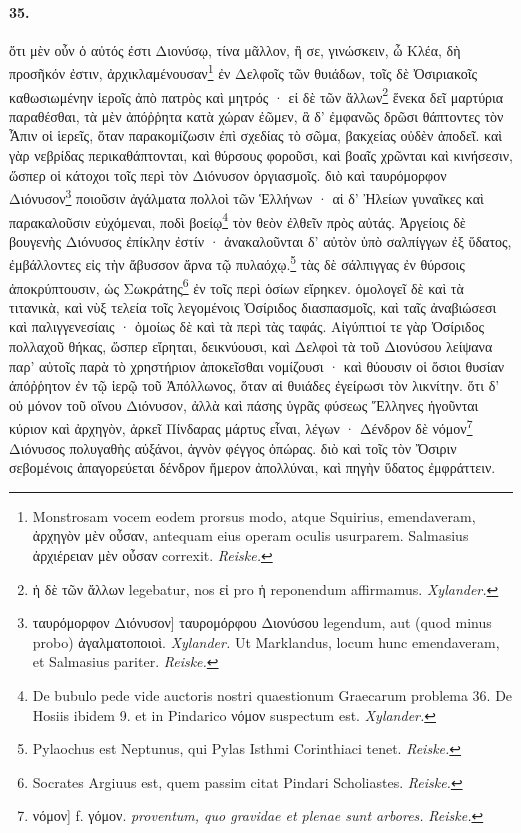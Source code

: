 \documentclass[a4paper, 11pt, oneside, polutonikogreek, german, landscape]{article}
\begin{document}
\paragraph{35.}
ὅτι μὲν οὖν ὁ αὐτός ἐστι Διονύσῳ, τίνα μᾶλλον, ἢ σε, γινώσκειν, ὦ Κλέα, δὴ προσῆκόν ἐστιν, ἀρχικλαμένουσαν\footnote{Monstrosam vocem eodem prorsus modo, atque Squirius, emendaveram, ἀρχηγὸν μὲν οὖσαν, antequam eius operam oculis usurparem. Salmasius ἀρχιέρειαν μὲν οὖσαν correxit. \emph{Reiske.}} ἐν Δελφοῖς τῶν θυιάδων, τοῖς δὲ Ὀσιριακοῖς καθωσιωμένην ἱεροῖς ἀπὸ πατρὸς καὶ μητρός · εἰ δὲ τῶν ἄλλων\footnote{ἡ δὲ τῶν ἄλλων legebatur, nos εἰ pro ἡ reponendum affirmamus. \emph{Xylander.}} ἕνεκα δεῖ μαρτύρια παραθέσθαι, τὰ μὲν ἀπόῤῥητα κατὰ χώραν ἐῶμεν, ἃ δ' ἐμφανῶς δρῶσι θάπτοντες τὸν Ἆπιν οἱ ἱερεῖς, ὅταν παρακομίζωσιν ἐπὶ σχεδίας τὸ σῶμα, βακχείας οὐδὲν ἀποδεῖ. καὶ γὰρ νεβρίδας περικαθάπτονται, καὶ θύρσους φοροῦσι, καὶ βοαῖς χρῶνται καὶ κινήσεσιν, ὥσπερ οἱ κάτοχοι τοῖς περὶ τὸν Διόνυσον ὀργιασμοῖς. διὸ καὶ ταυρόμορφον Διόνυσον\footnote{ταυρόμορφον Διόνυσον] ταυρομόρφου Διονύσου legendum, aut (quod minus probo) ἀγαλματοποιοὶ. \emph{Xylander.} Ut Marklandus, locum hunc emendaveram, et Salmasius pariter. \emph{Reiske.}} ποιοῦσιν ἀγάλματα πολλοὶ τῶν Ἑλλήνων · αἱ δ' Ἠλείων γυναῖκες καὶ παρακαλοῦσιν εὐχόμεναι, ποδὶ βοείῳ\footnote{De bubulo pede vide auctoris nostri quaestionum Graecarum problema 36. De Hosiis ibidem 9. et in Pindarico νόμον suspectum est. \emph{Xylander.}} τὸν θεὸν ἐλθεῖν πρὸς αὐτάς. Ἀργείοις δὲ βουγενὴς Διόνυσος ἐπίκλην ἐστίν · ἀνακαλοῦνται δ' αὐτὸν ὑπὸ σαλπίγγων ἐξ ὕδατος, ἐμβάλλοντες εἰς τὴν ἄβυσσον ἄρνα τῷ πυλαόχῳ.\footnote{Pylaochus est Neptunus, qui Pylas Isthmi Corinthiaci tenet. \emph{Reiske.}} τὰς δὲ σάλπιγγας ἐν θύρσοις ἀποκρύπτουσιν, ὡς Σωκράτης\footnote{Socrates Argiuus est, quem passim citat Pindari Scholiastes. \emph{Reiske.}} ἐν τοῖς περὶ ὁσίων εἴρηκεν. ὁμολογεῖ δὲ καὶ τὰ τιτανικὰ, καὶ νὺξ τελεία τοῖς λεγομένοις Ὀσίριδος διασπασμοῖς, καὶ ταῖς ἀναβιώσεσι καὶ παλιγγενεσίαις · ὁμοίως δὲ καὶ τὰ περὶ τὰς ταφάς. Αἰγύπτιοί τε γὰρ Ὀσίριδος πολλαχοῦ θήκας, ὥσπερ εἴρηται, δεικνύουσι, καὶ Δελφοὶ τὰ τοῦ Διονύσου λείψανα παρ' αὐτοῖς παρὰ τὸ χρηστήριον ἀποκεῖσθαι νομίζουσι · καὶ θύουσιν οἱ ὅσιοι θυσίαν ἀπόῤῥητον ἐν τῷ ἱερῷ τοῦ Ἀπόλλωνος, ὅταν αἱ θυιάδες ἐγείρωσι τὸν λικνίτην. ὅτι δ' οὐ μόνον τοῦ οἴνου Διόνυσον, ἀλλὰ καὶ πάσης ὑγρᾶς φύσεως Ἕλληνες ἡγοῦνται κύριον καὶ ἀρχηγὸν, ἀρκεῖ Πίνδαρας μάρτυς εἶναι, λέγων · Δένδρον δὲ νόμον\footnote{νόμον] f. γόμον. \emph{proventum, quo gravidae et plenae sunt arbores.} \emph{Reiske.}} Διόνυσος πολυγαθὴς αὐξάνοι, ἀγνὸν φέγγος ὀπώρας. διὸ καὶ τοῖς τὸν Ὄσιριν σεβομένοις ἀπαγορεύεται δένδρον ἥμερον ἀπολλύναι, καὶ πηγὴν ὕδατος ἐμφράττειν.
\end{document}
